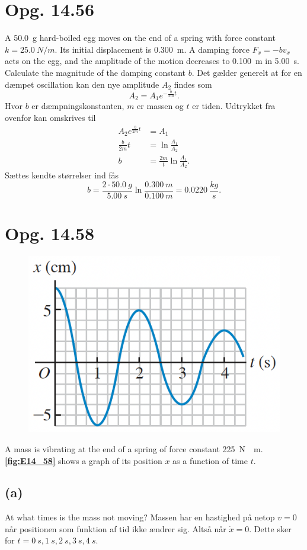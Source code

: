 \documentclass[12pt]{article}
\theoremstyle{definition}
\begin{document}
\section*{Opg. 14.56}
A \qty{50,0}{g} hard-boiled egg moves on the end of a spring with force constant $k = \qty{25,0}{N \per m}$. Its initial displacement is \qty{0,300}{m}. A damping force $F_x = -bv_x$ acts on the egg, and the amplitude of the motion decreases to \qty{0,100}{m} in \qty{5,00}{s}. Calculate the magnitude of the damping constant $b$.
\bigbreak
Det gælder generelt at for en dæmpet oscillation kan den nye amplitude $A_2$ findes som
\[ 
A_2 = A_1 e^{-\frac{b}{2m}t}
.\]
Hvor $b$ er dæmpningskonstanten, $m$ er massen og $t$ er tiden. Udtrykket fra ovenfor kan omskrives til
\begin{align*}
  A_2 e^{\frac{b}{2m}t} &= A_1 \\
  \frac{b}{2m}t &= \ln \frac{A_1}{A_2} \\
  b &= \frac{2m}{t} \ln \frac{A_1}{A_2}
.\end{align*}
Sættes kendte størrelser ind fås
\[ 
b = \frac{2 \cdot \qty{50,0}{g}}{\qty{5,00}{s}} \ln \frac{\qty{0,300}{m}}{\qty{0,100}{m}} = \qty{0,0220}{\frac{kg}{s}}  
.\]



\section*{Opg. 14.58}
\begin{figure} [ht]
  \centering
  \caption{}
  \includegraphics[width=0.5\linewidth]{../figures/E14_58.png}
  \label{fig:E14_58}
\end{figure}
A mass is vibrating at the end of a spring of force constant \qty{225}{N \per m}. \textbf{\autoref{fig:E14_58}} shows a graph of its position $x$ as a function of time $t$.

\subsection*{(a)}
At what times is the mass not moving?
\bigbreak
Massen har en hastighed på netop $v = 0$ når positionen som funktion af tid ikke ændrer sig. Altså når $\dot{x} = 0$. Dette sker for $t = \qty{0}{s}, \qty{1}{s}, \qty{2}{s}, \qty{3}{s}, \qty{4}{s}$.
\end{document}
